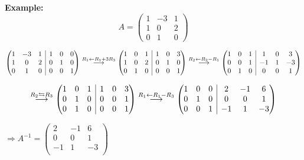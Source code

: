 \documentclass[12pt]{article}
\theoremstyle{plain}
\newcommand{\la}{\leftarrow}
\newcommand{\rvline}{\hspace*{-\arraycolsep}\vline\hspace*{-\arraycolsep}}
\begin{document}
{\color{Brown}
\textbf{Example: }
\[
	A = 
	\begin{pmatrix}
		1 & -3 & 1\\
		1 & 0 & 2\\
		0 & 1 & 0 
	\end{pmatrix}
\]

\[
	\begin{pmatrix}
		1 & -3 & 1 & \rvline & 1 & 0 & 0\\
		1 & 0 & 2 & \rvline & 0 & 1 & 0	\\
		0 & 1 & 0 & \rvline & 0 & 0 & 1	\\
	\end{pmatrix}
	\overset{R_1 \la R_1 + 3R_3}{\longrightarrow}
	\begin{pmatrix}
		1 & 0 & 1 & \rvline & 1 & 0 & 3 \\
		1 & 0 & 2 & \rvline & 0 & 1 & 0	\\
		0 & 1 & 0 & \rvline & 0 & 0 & 1	\\
	\end{pmatrix}
	\overset{R_2 \la R_2 - R_1}{\longrightarrow}
	\begin{pmatrix}
		1 & 0 & 1 & \rvline & 1 & 0 & 3		\\
		0 & 0 & 1 & \rvline & -1 & 1 & -3	\\
		0 & 1 & 0 & \rvline & 0 & 0 & 1		\\
	\end{pmatrix}
\]

\[
	\overset{R_2 \leftrightarrows R_3}{\longrightarrow}
	\begin{pmatrix}
		1 & 0 & 1 & \rvline & 1 & 0 & 3\\
		0 & 1 & 0 & \rvline & 0 & 0& 1	\\
		0 & 1 & 0 & \rvline & 0 & 0 & 1	\\
	\end{pmatrix}
	\overset{R_1 \la R_1 - R_3}{\longrightarrow}
	\begin{pmatrix}
		1 & 0 & 0 & \rvline & 2 & -1 & 6\\
		0 & 1 & 0 & \rvline & 0 & 0 & 1	\\
		0 & 0 & 1 & \rvline & -1 & 1 & -3	\\
	\end{pmatrix}
\]

$\Rightarrow A^{-1} = 
\begin{pmatrix}
	2 & -1 & 6	\\
	0 & 0 & 1	\\
	-1 & 1 & -3	\\
\end{pmatrix}$

}
\end{document}
